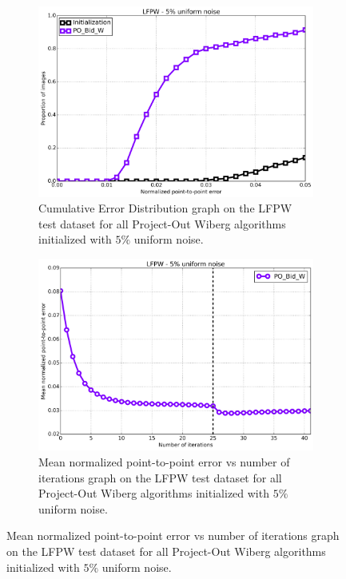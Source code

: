 \begin{figure}[p]
	\centering
	\begin{subfigure}{0.48\textwidth}
	    \includegraphics[width=\textwidth]{experiments/algorithms/po_w/ced_po_w_5.png}
	    \caption{Cumulative Error Distribution graph on the LFPW test dataset for all Project-Out Wiberg algorithms initialized with $5\%$ uniform noise.}
	    \label{fig:ced_bpo_w_5}
	\end{subfigure}
	\hfill
	\begin{subfigure}{0.48\textwidth}
	    \includegraphics[width=\textwidth]{experiments/algorithms/po_w/mean_error_vs_iters_po_w_5.png}
	    \caption{Mean normalized point-to-point error vs number of iterations graph on the LFPW test dataset for all Project-Out Wiberg algorithms initialized with $5\%$ uniform noise.}
	    \label{fig:mean_error_vs_iters_bpo_w_5}

\end{subfigure}
\end{figure}

